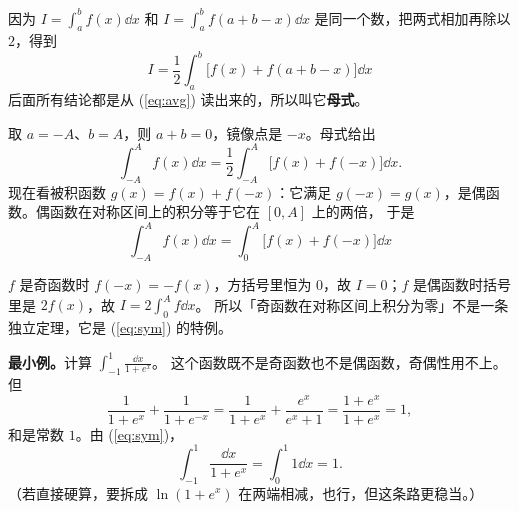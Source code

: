 \documentclass[11pt]{ctexart}
\begin{document}

因为 $I=\int_a^b f(x)\dd x$ 和 $I=\int_a^b f(a+b-x)\dd x$ 是同一个数，把两式相加再除以 $2$，得到
\begin{equation}
\boxed{\;I=\frac{1}{2}\int_a^b\Big[f(x)+f(a+b-x)\Big]\dd x\;}
\label{eq:avg}
\end{equation}
后面所有结论都是从 (\ref{eq:avg}) 读出来的，所以叫它\textbf{母式}。




取 $a=-A$、$b=A$，则 $a+b=0$，镜像点是 $-x$。母式给出
\[
\int_{-A}^{A} f(x)\dd x=\frac{1}{2}\int_{-A}^{A}\Big[f(x)+f(-x)\Big]\dd x .
\]
现在看被积函数 $g(x)=f(x)+f(-x)$：它满足 $g(-x)=g(x)$，是偶函数。偶函数在对称区间上的积分等于它在 $[0,A]$ 上的两倍，
于是
\begin{equation}
\boxed{\;\int_{-A}^{A} f(x)\dd x=\int_0^{A}\Big[f(x)+f(-x)\Big]\dd x\;}
\label{eq:sym}
\end{equation}



$f$ 是奇函数时 $f(-x)=-f(x)$，方括号里恒为 $0$，故 $I=0$；$f$ 是偶函数时括号里是 $2f(x)$，故 $I=2\int_0^{A}f\dd x$。
所以「奇函数在对称区间上积分为零」不是一条独立定理，它是 (\ref{eq:sym}) 的特例。


\textbf{最小例。}计算 $\displaystyle\int_{-1}^{1}\frac{\dd x}{1+e^{x}}$。
这个函数既不是奇函数也不是偶函数，奇偶性用不上。但
\[
\frac{1}{1+e^{x}}+\frac{1}{1+e^{-x}}
=\frac{1}{1+e^{x}}+\frac{e^{x}}{e^{x}+1}
=\frac{1+e^{x}}{1+e^{x}}=1 ,
\]
和是常数 $1$。由 (\ref{eq:sym})，
\[
\int_{-1}^{1}\frac{\dd x}{1+e^{x}}=\int_{0}^{1}1\dd x=1 .
\]
（若直接硬算，要拆成 $\ln(1+e^x)$ 在两端相减，也行，但这条路更稳当。）
\end{document}
